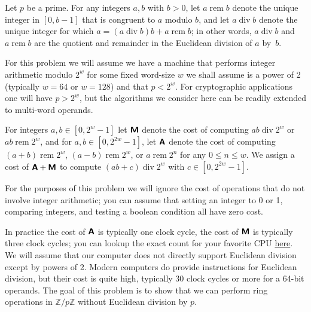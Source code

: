 \documentclass[11pt]{article}
\newcommand{\Z}{\mathbb{Z}}
\newcommand{\rem}{\operatorname{rem}}
\renewcommand{\div}{\operatorname{div}}
\newcommand{\M}{\textbf{\textsf M}}
\newcommand{\A}{\textbf{\textsf A}}
\begin{document}
Let $p$ be a prime.
For any integers $a,b$ with $b>0$, let $a\rem b$ denote the unique integer in $[0,b-1]$ that is congruent to $a$ modulo $b$, and let $a\div b$ denote the unique integer for which  $a = (a\div b)b + a\rem b$; in other words, $a\div b$ and $a\rem b$ are the quotient and remainder in the Euclidean division of $a$ by~$b$.

For this problem we will assume we have a machine that performs integer arithmetic modulo $2^w$ for some fixed word-size $w$ we shall assume is a power of 2 (typically $w=64$ or $w=128$) and that $p<2^w$.  For cryptographic applications one will have $p>2^w$, but the algorithms we consider here can be readily extended to multi-word operands.

For integers $a,b\in [0,2^w-1]$  let $\M$ denote the cost of computing $ab\div 2^w$ or $ab\rem 2^w$, and for $a,b\in [0,2^{2w}-1]$, let $\A$ denote the cost of computing $(a+b)\rem 2^w$, $(a-b)\rem 2^w$, or $a\rem 2^n$ for any $0\le n\le w$.  We assign a cost of $\A+\M$ to compute $(ab+c)\div 2^w$ with $c\in [0,2^{2w}-1]$.

For the purposes of this problem we will ignore the cost of operations that do not involve integer arithmetic; you can assume that setting an integer to 0 or 1, comparing integers, and testing a boolean condition all have zero cost.

In practice the cost of $\A$ is typically one clock cycle, the cost of $\M$ is typically three clock cycles; you can lookup the exact count for your favorite CPU \href{https://www.agner.org/optimize/instruction_tables.pdf}{here}.  We will assume that our computer does not directly support Euclidean division except by powers of 2. Modern computers do provide instructions for Euclidean division, but their cost is quite high, typically 30 clock cycles or more for a 64-bit operands.
The goal of this problem is to show that we can perform ring operations in $\Z/p\Z$ without Euclidean division by $p$.
\end{document}
